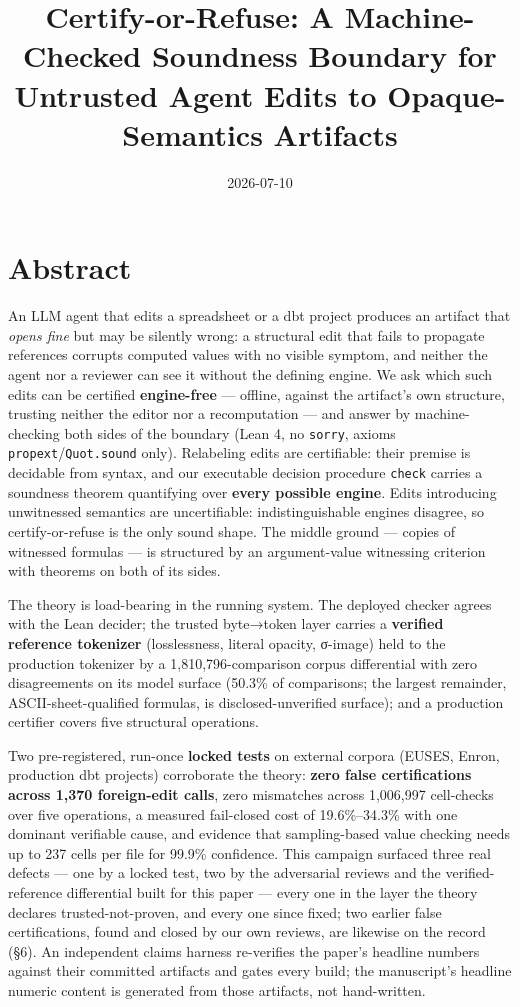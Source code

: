 \documentclass[
  11pt,
]{article}
\title{Certify-or-Refuse: A Machine-Checked Soundness Boundary for
Untrusted Agent Edits to Opaque-Semantics Artifacts}
\author{}
\date{2026-07-10}
\begin{document}
\maketitle

\section{Abstract}\label{abstract}

An LLM agent that edits a spreadsheet or a dbt project produces an
artifact that \emph{opens fine} but may be silently wrong: a structural
edit that fails to propagate references corrupts computed values with no
visible symptom, and neither the agent nor a reviewer can see it without
the defining engine. We ask which such edits can be certified
\textbf{engine-free} --- offline, against the artifact's own structure,
trusting neither the editor nor a recomputation --- and answer by
machine-checking both sides of the boundary (Lean 4, no \texttt{sorry},
axioms \texttt{propext}/\texttt{Quot.sound} only). Relabeling edits are
certifiable: their premise is decidable from syntax, and our executable
decision procedure \texttt{check} carries a soundness theorem
quantifying over \textbf{every possible engine}. Edits introducing
unwitnessed semantics are uncertifiable: indistinguishable engines
disagree, so certify-or-refuse is the only sound shape. The middle
ground --- copies of witnessed formulas --- is structured by an
argument-value witnessing criterion with theorems on both of its sides.

The theory is load-bearing in the running system. The deployed checker
agrees with the Lean decider; the trusted byte→token layer carries a
\textbf{verified reference tokenizer} (losslessness, literal opacity,
σ-image) held to the production tokenizer by a 1,810,796-comparison
corpus differential with zero disagreements on its model surface (50.3\%
of comparisons; the largest remainder, ASCII-sheet-qualified formulas,
is disclosed-unverified surface); and a production certifier covers five
structural operations.

Two pre-registered, run-once \textbf{locked tests} on external corpora
(EUSES, Enron, production dbt projects) corroborate the theory:
\textbf{zero false certifications across 1,370 foreign-edit calls}, zero
mismatches across 1,006,997 cell-checks over five operations, a measured
fail-closed cost of 19.6\%--34.3\% with one dominant verifiable cause,
and evidence that sampling-based value checking needs up to 237 cells
per file for 99.9\% confidence. This campaign surfaced three real
defects --- one by a locked test, two by the adversarial reviews and the
verified-reference differential built for this paper --- every one in
the layer the theory declares trusted-not-proven, and every one since
fixed; two earlier false certifications, found and closed by our own
reviews, are likewise on the record (§6). An independent claims harness
re-verifies the paper's headline numbers against their committed
artifacts and gates every build; the manuscript's headline numeric
content is generated from those artifacts, not hand-written.
\end{document}
